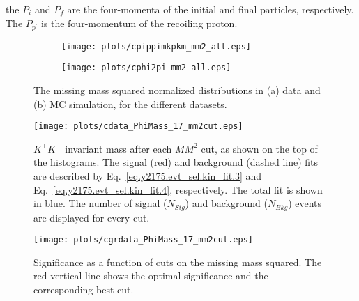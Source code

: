\noindent the $P_i$ and $P_f$ are the four-momenta of the initial and final particles, respectively. The $P_{p^{\prime}}$ is the four-momentum of the recoiling proton.

\begin{figure}[H]
    \centering
    \begin{subfigure}[b]{0.5\textwidth}
        \texttt{[image: plots/cpippimkpkm\_mm2\_all.eps]}
        \caption{}
        \label{fig.y2175.evt_sel.mis_mass_sqrt.1.a}
    \end{subfigure}\hfill
    \begin{subfigure}[b]{0.5\textwidth}
        \texttt{[image: plots/cphi2pi\_mm2\_all.eps]}
        \caption{}
        \label{fig.y2175.evt_sel.mis_mass_sqrt.1.b}
    \end{subfigure}
    \caption{The missing mass squared normalized distributions in (a) data and (b) MC simulation, for the different datasets.}
    \label{fig.y2175.evt_sel.mis_mass_sqrt.1}
\end{figure}

\begin{figure}[H]
    \centering
        \texttt{[image: plots/cdata\_PhiMass\_17\_mm2cut.eps]}
        \caption{$K^+K^-$ invariant mass after each $MM^2$ cut, as shown on the top of the histograms. The signal (red) and background (dashed line) fits are described by Eq.~\ref{eq.y2175.evt_sel.kin_fit.3} and Eq.~\ref{eq.y2175.evt_sel.kin_fit.4}, respectively. The total fit is shown in blue. The number of signal ($N_{Sig}$) and background ($N_{Bkg}$) events are displayed for every cut.}
        \label{fig.y2175.evt_sel.mis_mass_sqrt.2}
\end{figure}

\begin{center}
\null
\vfill
\begin{figure}[htbp]
    \centering
        \texttt{[image: plots/cgrdata\_PhiMass\_17\_mm2cut.eps]}
        \caption{Significance as a function of cuts on the missing mass squared. The red vertical line shows the optimal significance and the corresponding best cut.}
        \label{fig.y2175.evt_sel.mis_mass_sqrt.3}
\end{figure}
\null
\vfill
\end{center}

